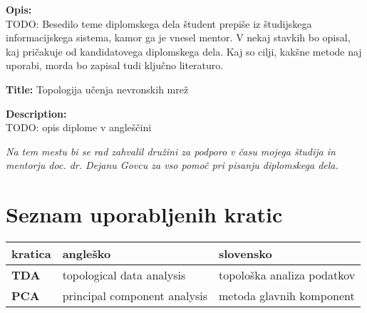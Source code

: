 \bigskip
\noindent\textbf{Opis:}\\
TODO: Besedilo teme diplomskega dela študent prepiše iz študijskega informacijskega sistema, kamor ga je vnesel mentor. 
V nekaj stavkih bo opisal, kaj pričakuje od kandidatovega diplomskega dela. 
Kaj so cilji, kakšne metode naj uporabi, morda bo zapisal tudi ključno literaturo.

\bigskip
\noindent\textbf{Title:} Topologija učenja nevronskih mrež

\bigskip
\noindent\textbf{Description:}\\
TODO: opis diplome v angleščini

\vfill



\vspace{2cm}

\clearemptydoublepage

\thispagestyle{empty}\mbox{}\vfill\null\it%
\noindent
Na tem mestu bi se rad zahvalil družini za podporo v času mojega študija in mentorju doc. dr. Dejanu Govcu za vso pomoč pri pisanju diplomskega dela.
\rm\normalfont

\clearemptydoublepage

\clearemptydoublepage


\pagestyle{empty}
\def\thepage{}%
\tableofcontents{}


\clearemptydoublepage

\chapter*{Seznam uporabljenih kratic}

\noindent\begin{tabular}{p{}|p{}|p{}}    %
  {\bf kratica} & {\bf angleško}                              & {\bf slovensko} \\ \hline
  {\bf TDA}      & topological data analysis               & topološka analiza podatkov \\
  {\bf PCA}      & principal component analysis               & metoda glavnih komponent \\

\end{tabular}


